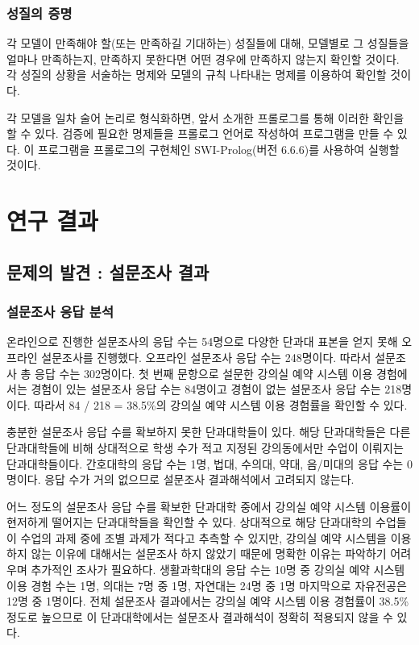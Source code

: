 \documentclass[11pt,a4paper]{article}
\begin{document}
\subsubsection{성질의 증명}
각 모델이 만족해야 할(또는 만족하길 기대하는) 성질들에 대해, 모델별로 그
성질들을 얼마나 만족하는지, 만족하지 못한다면 어떤 경우에 만족하지 않는지
확인할 것이다. 각 성질의 상황을 서술하는 명제와 모델의 규칙 나타내는 명제를
이용하여 확인할 것이다.

각 모델을 일차 술어 논리로 형식화하면, 앞서 소개한 프롤로그를 통해 이러한
확인을 할 수 있다. 검증에 필요한 명제들을 프롤로그 언어로 작성하여 프로그램을
만들 수 있다. 이 프로그램을 프롤로그의 구현체인 SWI-Prolog(버전 6.6.6)를
사용하여 실행할 것이다.

\section{연구 결과}

\subsection{문제의 발견 : 설문조사 결과}

\subsubsection{설문조사 응답 분석}
온라인으로 진행한 설문조사의 응답 수는 54명으로 다양한 단과대 표본을 얻지 못해
오프라인 설문조사를 진행했다. 오프라인 설문조사 응답 수는 248명이다. 따라서
설문조사 총 응답 수는 302명이다. 첫 번째 문항으로 설문한 강의실 예약 시스템
이용 경험에서는 경험이 있는 설문조사 응답 수는 84명이고 경험이 없는 설문조사
응답 수는 218명이다. 따라서 84 / 218 = 38.5\%의 강의실 예약 시스템 이용
경험률을 확인할 수 있다.

충분한 설문조사 응답 수를 확보하지 못한 단과대학들이 있다. 해당 단과대학들은
다른 단과대학들에 비해 상대적으로 학생 수가 적고 지정된 강의동에서만 수업이
이뤄지는 단과대학들이다. 간호대학의 응답 수는 1명, 법대, 수의대, 약대,
음/미대의 응답 수는 0명이다. 응답 수가 거의 없으므로 설문조사 결과해석에서
고려되지 않는다.

어느 정도의 설문조사 응답 수를 확보한 단과대학 중에서 강의실 예약 시스템
이용률이 현저하게 떨어지는 단과대학들을 확인할 수 있다. 상대적으로 해당
단과대학의 수업들이 수업의 과제 중에 조별 과제가 적다고 추측할 수 있지만,
강의실 예약 시스템을 이용하지 않는 이유에 대해서는 설문조사 하지 않았기 때문에
명확한 이유는 파악하기 어려우며 추가적인 조사가 필요하다. 생활과학대의 응답
수는 10명 중 강의실 예약 시스템 이용 경험 수는 1명, 의대는 7명 중 1명, 자연대는
24명 중 1명 마지막으로 자유전공은 12명 중 1명이다. 전체 설문조사 결과에서는
강의실 예약 시스템 이용 경험률이 38.5\% 정도로 높으므로 이 단과대학에서는
설문조사 결과해석이 정확히 적용되지 않을 수 있다.
\end{document}

